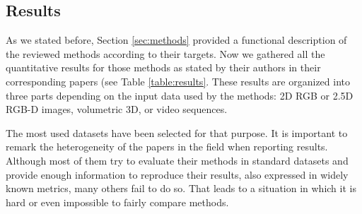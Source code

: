 \subsection{Results}

As we stated before, Section \ref{sec:methods} provided a functional description of the reviewed methods according to their targets. Now we gathered all the quantitative results for those methods as stated by their authors in their corresponding papers (see Table \ref{table:results}. These results are organized into three parts depending on the input data used by the methods: \acs{2D} \acs{RGB} or \acs{2.5D} \acs{RGB-D} images, volumetric \acs{3D}, or video sequences.

The most used datasets have been selected for that purpose. It is important to remark the heterogeneity of the papers in the field when reporting results. Although most of them try to evaluate their methods in standard datasets and provide enough information to reproduce their results, also expressed in widely known metrics, many others fail to do so. That leads to a situation in which it is hard or even impossible to fairly compare methods.

